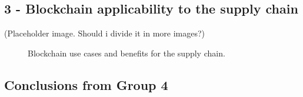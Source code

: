 
\subsection*{3 - Blockchain applicability to the supply chain}
 

(Placeholder image. Should i divide it in more images?)

\begin{figure}[ht]

    
      \caption{Blockchain use cases and benefits for the supply chain.}
    \label{fig:group4_graphics}
\end{figure}


\subsection*{Conclusions from Group 4}